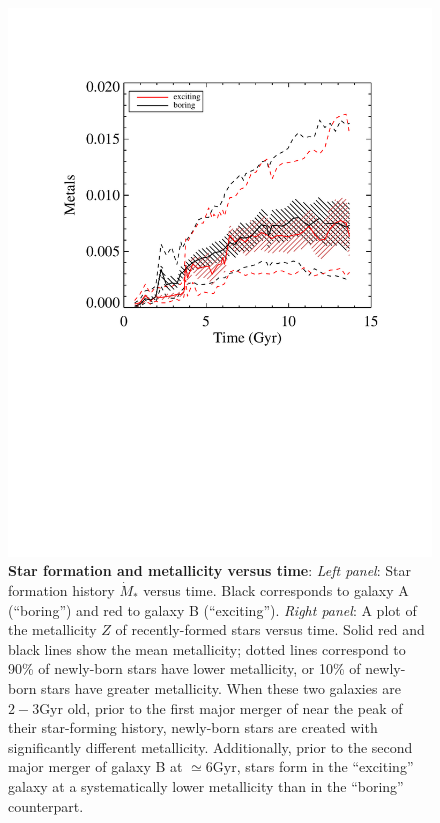\documentclass[nofootinbib,twocolumn,prd]{emulateapj}
\newcommand\unit[1]{\text{#1}}
\begin{document}
\begin{figure}
\includegraphics[width=\columnwidth]{Figures/zvst}
\caption{\label{fig:TwoGalaxies}\textbf{Star formation and metallicity versus time}:  \emph{Left panel}: Star formation history $\dot{M}_{*}$
  versus time.  Black corresponds to galaxy A (``boring'') and red to galaxy B (``exciting'').  
\emph{Right panel}: A plot of the  metallicity $Z$ of recently-formed stars versus time.  Solid red and black lines show
the mean metallicity; dotted lines correspond to  90\% of newly-born stars have lower metallicity,   or 10\% of
newly-born stars have greater metallicity.  When these two galaxies are $2-3\unit{Gyr}$ old, prior to the first major
merger of  near the peak of their
star-forming history, newly-born stars are created with significantly different metallicity.  Additionally, prior to the
second major merger of galaxy B at $\simeq 6\unit{Gyr}$, stars form in the ``exciting'' galaxy at a systematically lower
metallicity than in the ``boring'' counterpart.
}
\end{figure}
\end{document}
